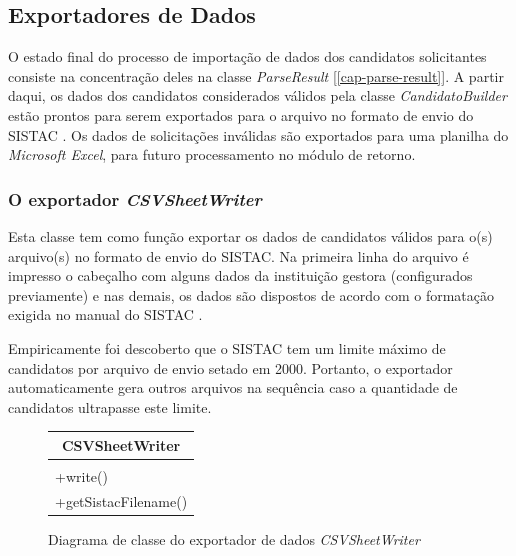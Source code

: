 \documentclass[
	12pt,			%
	openright,		%
	oneside,	
	a4paper,		%
	english,		%
	brazil			%
]{abntex2/abntex2}  %
\begin{document}
	\subsection{Exportadores de Dados}
	
	O estado final do processo de importação de dados dos candidatos solicitantes consiste na concentração deles na classe \textit{ParseResult} [\ref{cap-parse-result}]. A partir daqui, os dados dos candidatos considerados válidos pela classe \textit{CandidatoBuilder} estão prontos para serem exportados para o arquivo no formato de envio do SISTAC \cite{sistac-formatos}. Os dados de solicitações inválidas são exportados para uma planilha do \textit{Microsoft Excel}, para futuro processamento no módulo de retorno.
	
	\subsubsection{O exportador \textit{CSVSheetWriter}}
	
	Esta classe tem como função exportar os dados de candidatos válidos para o(s) arquivo(s) no formato de envio do SISTAC. Na primeira linha do arquivo é impresso o cabeçalho com alguns dados da instituição gestora (configurados previamente) e nas demais, os dados são dispostos de acordo com o formatação exigida no manual do SISTAC \cite{sistac-formatos}.
	
	Empiricamente foi descoberto que o SISTAC tem um limite máximo de candidatos por arquivo de envio setado em 2000. Portanto, o exportador automaticamente gera outros arquivos na sequência caso a quantidade de candidatos ultrapasse este limite.
	
	\begin{figure}[H]
		\begin{center}
			
			\caption{Diagrama de classe do exportador de dados \textit{CSVSheetWriter}}
			\label{csvwriter-uml}
			
			\begin{tabular}{|l|}
				\hline
				\multicolumn{1}{|c|}{\textbf{CSVSheetWriter}} \\ \hline
				\\ \hline
				+write()                                      \\
				+getSistacFilename()                          \\ \hline
			\end{tabular}
			
		\end{center}
	\end{figure}
	
\end{document}
